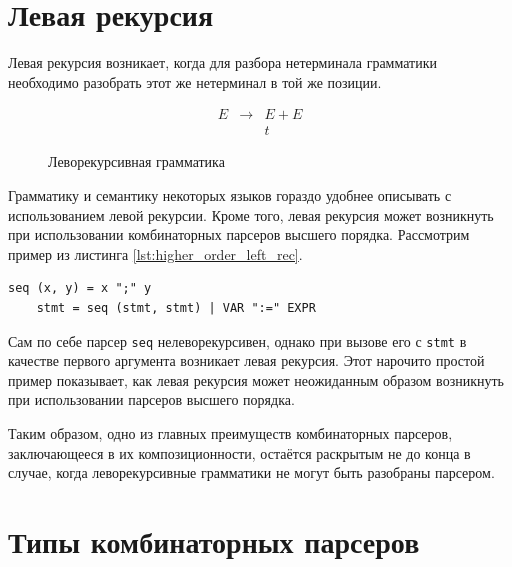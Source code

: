 \documentclass[times]{itmo-student-thesis}
\begin{document}
\section{Левая рекурсия}\label{sec:left_recursion}

Левая рекурсия возникает, когда для разбора нетерминала грамматики необходимо разобрать этот же нетерминал в той же позиции. 

\begin{figure}[!h]
    \caption{Леворекурсивная грамматика}\label{leftrec_grammar}
    \[
        \begin{array}{lll}
            E & \to & E+E \\
              &     & t
        \end{array}
    \]
\end{figure}

Грамматику и семантику некоторых языков гораздо удобнее описывать с использованием левой рекурсии. Кроме того,
левая рекурсия может возникнуть при использовании комбинаторных парсеров высшего порядка. Рассмотрим пример из листинга 
\ref{lst:higher_order_left_rec}.

\begin{lstlisting}[float=!h,caption={Возникновение левой рекурсии},label={lst:higher_order_left_rec}]
    seq (x, y) = x ";" y
    stmt = seq (stmt, stmt) | VAR ":=" EXPR
\end{lstlisting}

Сам по себе парсер \lstinline{seq} нелеворекурсивен, однако при вызове его с \lstinline{stmt} в качестве первого аргумента возникает левая рекурсия.
Этот нарочито простой пример показывает, как левая рекурсия может неожиданным образом возникнуть при использовании
парсеров высшего порядка.

Таким образом, одно из главных преимуществ комбинаторных парсеров, заключающееся в их композиционности, остаётся
раскрытым не до конца в случае, когда леворекурсивные грамматики не могут быть разобраны парсером.

\section{Типы комбинаторных парсеров}\label{sec:parser_combinators_types}
\end{document}
